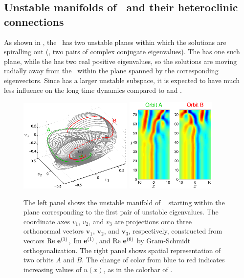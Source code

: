 \subsection{Unstable manifolds of \eqva\ and their heteroclinic
            connections}
\label{sec:unstMnflds}

As shown in ,
the  \eqv\ has two unstable
planes within which the solutions are spiralling out (\ie, two
pairs of complex conjugate eigenvalues).  The  has one such plane,
while the  has two real positive eigenvalues, so the solutions are
moving radially away from the \eqv\ within the plane spanned
by the corresponding eigenvectors.  Since  has
a larger unstable subspace, it is expected to have much less influence on the
long time dynamics compared to  and .

\begin{figure}[t]
\begin{center}
\includegraphics[width=0.5\textwidth, clip=true]{figs/ks22_E1_plane1_manifold_c.eps}
\includegraphics[width=0.4\textwidth, clip=true]{figs/ks22_E1_plane1_orbits_c.eps}
\end{center}
\caption{
The left panel shows the unstable
manifold of \eqv\  starting within the plane
corresponding to the first pair of unstable eigenvalues. The
coordinate axes $v_1$, $v_2$, and $v_3$ are
projections onto three orthonormal vectors
$\mathbf{v}_1$, $\mathbf{v}_2$, and $\mathbf{v}_3$,
respectively,
constructed from vectors
${\rm Re\,} \,{\mathbf e}^{(1)}$, ${\rm Im\,} \,{\mathbf e}^{(1)}$,
and ${\rm Re\,} \,{\mathbf e}^{(6)}$
by Gram-Schmidt orthogonalization.
The right panel shows spatial representation of two orbits $A$ and $B$.
The change of color from blue to red indicates increasing values of
$u(x)$, as in the colorbar of .
}
\label{f:KS22E1man1}
\end{figure}

